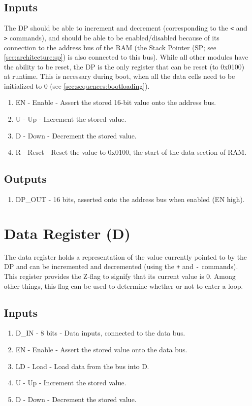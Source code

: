 \subsection*{Inputs}
The DP should be able to increment and decrement (corresponding to the \texttt{<} and \texttt{>} commands), and should be able to be enabled/disabled because of its connection to the address bus of the RAM (the Stack Pointer (SP; see \ref{sec:architecture:sp}) is also connected to this bus). While all other modules have the ability to be reset, the DP is the only register that can be reset (to 0x0100) at runtime. This is necessary during boot, when all the data cells need to be initialized to 0 (see \ref{sec:sequences:bootloading}).

\begin{enumerate}
\itemsep0em 
\item EN - Enable - Assert the stored 16-bit value onto the address bus.
\item U - Up - Increment the stored value.
\item D - Down - Decrement the stored value.
\item R - Reset - Reset the value to 0x0100, the start of the data section of RAM.
\end{enumerate}

\subsection*{Outputs}
\begin{enumerate}
\itemsep0em   
\item DP\_OUT - 16 bits, asserted onto the address bus when enabled (EN high).
\end{enumerate}

\section{Data Register (D)} \label{sec:architecture:d}
The data register holds a representation of the value currently pointed to by the DP and can be incremented and decremented (using the \texttt{+} and \texttt{-} commands). This register provides the Z-flag to signify that its current value is 0. Among other things, this flag can be used to determine whether or not to enter a loop.

\subsection*{Inputs}
\begin{enumerate}
\itemsep0em   
\item D\_IN - 8 bits - Data inputs, connected to the data bus.
\item EN - Enable - Assert the stored value onto the data bus.
\item LD - Load - Load data from the bus into D.
\item U - Up - Increment the stored value.
\item D - Down - Decrement the stored value.
\end{enumerate}


